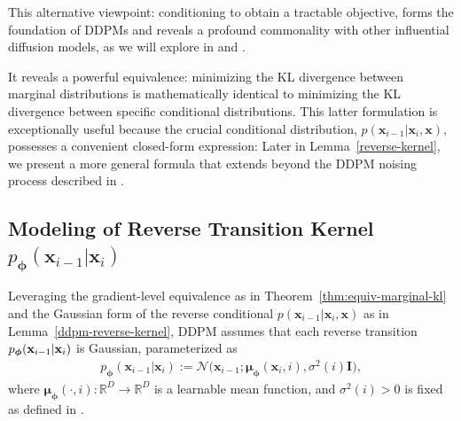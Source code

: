 This alternative viewpoint: conditioning to obtain a tractable objective, forms the foundation of DDPMs and reveals a profound commonality with other influential diffusion models, as we will explore in  and .


It reveals a powerful equivalence: minimizing the KL divergence between marginal distributions is mathematically identical to minimizing the KL divergence between specific conditional distributions. This latter formulation is exceptionally useful because the crucial conditional distribution, $p(\mathbf{x}_{i-1}|\mathbf{x}_i, \mathbf{x})$, possesses a convenient closed-form expression:
Later in Lemma~\ref{reverse-kernel}, we present a more general formula that extends beyond the DDPM noising process described in .


\subsection{Modeling of Reverse Transition Kernel $p_{\bm{\phi}}(\mathbf{x}_{i-1}|\mathbf{x}_i)$} Leveraging the gradient-level equivalence as in Theorem~\ref{thm:equiv-marginal-kl} and the Gaussian form of the reverse conditional $p(\mathbf{x}_{i-1}|\mathbf{x}_i, \mathbf{x})$ as in Lemma~\ref{ddpm-reverse-kernel}, DDPM assumes that each reverse transition $p_{\bm{\phi}}({\mathbf{x}}_{i-1}| {\mathbf{x}}_i)$ is Gaussian, parameterized as
\begin{align}\label{eq:def-reverse}
    p_{\bm{\phi}}(\mathbf{x}_{i-1}|\mathbf{x}_i) := \mathcal{N}\big(\mathbf{x}_{i-1}; \bm{\mu}_{\bm{\phi}}(\mathbf{x}_i, i), \sigma^2(i) \mathbf{I}\big),
\end{align}
where $\bm{\mu}_{\bm{\phi}}(\cdot, i) \colon \mathbb{R}^D \to \mathbb{R}^D$ is a learnable mean function, and $\sigma^2(i) > 0$ is fixed as defined in .

